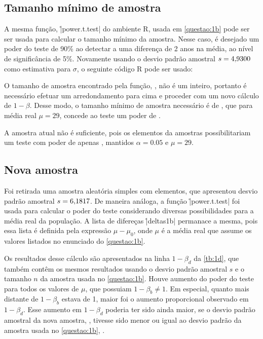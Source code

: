 	

\subsection{Tamanho mínimo de amostra}
\label{questao:1c}

	A mesma função, \r|power.t.test| do ambiente R, usada em
	\autoref{questao:1b} pode ser ser usada para calcular o tamanho mínimo
	da amostra. Nesse caso, é desejado um poder do teste de 90\% ao detectar
	a uma diferença de 2 anos na média, ao nível de significância de 5\%.
	Novamente usando o desvio padrão amostral $s = \num{4.9300}$ como estimativa
	para $\sigma$, o seguinte código R pode ser usado:


	O tamanho de amostra encontrado pela função, \UMCn, não é um
	inteiro, portanto é necessário efetuar um arredondamento para cima e
	proceder com um novo cálculo de $1-\beta$. Desse modo, o tamanho
	mínimo de amostra necessário é de \UMCnMin, que para média real $\mu
	= 29$, concede ao teste um poder de \UMCbeta.

	A amostra atual não é suficiente, pois os \UMAn elementos da
	amostras possibilitariam um teste com poder de apenas \UMCbetaOld,
	mantidos $\alpha = 0.05$ e $\mu = 29$.

\subsection{Nova amostra}
\label{questao:1d}

Foi retirada uma amostra aleatória simples com \UMCnMin elementos, que apresentou desvio padrão amostral $s = \num{6.1817}$. De maneira análoga, a função \r|power.t.test| foi usada para calcular o poder do teste considerando diversas possibilidades para a média real da população. A lista de difereças \r|deltas1b|  permanace a mesma, pois essa lista é definida pela expressão $\mu - \mu_0$, onde $\mu$ é a média real que assume os valores listados no enunciado do \autoref{questao:1b}.


Os resultados desse cálculo são apresentados na linha $1 - \beta_d$ da \autoref{tb:1d}, que também contêm os mesmos resultados usando o desvio padrão amostral $s$ e o tamanho $n$ da amostra usada no \autoref{questao:1b}. Houve aumento do poder do teste para todos os valores de $\mu$, que possuiam $1 - \beta_b \neq 1$. Em especial, quanto mais distante de $1 - \beta_b$ estava de 1, maior foi o aumento proporcional observado em $1 - \beta_d$. Esse aumento em $1 - \beta_d$ poderia ter sido ainda maior, se o desvio padrão amostral da nova amostra, \UMDs, tivesse sido menor ou igual ao desvio padrão da amostra usada no \autoref{questao:1b}, \UMAs.

